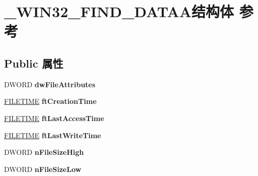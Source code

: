 \hypertarget{struct___w_i_n32___f_i_n_d___d_a_t_a_a}{}\section{\+\_\+\+W\+I\+N32\+\_\+\+F\+I\+N\+D\+\_\+\+D\+A\+T\+A\+A结构体 参考}
\label{struct___w_i_n32___f_i_n_d___d_a_t_a_a}
\subsection*{Public 属性}
\begin{DoxyCompactItemize}
\item 
\mbox{\label{struct___w_i_n32___f_i_n_d___d_a_t_a_a_a7dc6feecb5071ea3bcc9bca74797bab4}} 
D\+W\+O\+RD {\bfseries dw\+File\+Attributes}
\item 
\mbox{\label{struct___w_i_n32___f_i_n_d___d_a_t_a_a_ac8481fb5fca1f97285088f5cc46f7925}} 
\hyperlink{struct___f_i_l_e_t_i_m_e}{F\+I\+L\+E\+T\+I\+ME} {\bfseries ft\+Creation\+Time}
\item 
\mbox{\label{struct___w_i_n32___f_i_n_d___d_a_t_a_a_a845c08313fdf11eff063ca54fb3af2aa}} 
\hyperlink{struct___f_i_l_e_t_i_m_e}{F\+I\+L\+E\+T\+I\+ME} {\bfseries ft\+Last\+Access\+Time}
\item 
\mbox{\label{struct___w_i_n32___f_i_n_d___d_a_t_a_a_ae994c97328d0e6eadd3cad2975192aac}} 
\hyperlink{struct___f_i_l_e_t_i_m_e}{F\+I\+L\+E\+T\+I\+ME} {\bfseries ft\+Last\+Write\+Time}
\item 
\mbox{\label{struct___w_i_n32___f_i_n_d___d_a_t_a_a_a2993fb25d556173675c4642765cdc9ea}} 
D\+W\+O\+RD {\bfseries n\+File\+Size\+High}
\item 
\mbox{\label{struct___w_i_n32___f_i_n_d___d_a_t_a_a_ac087a8c9d29499cacf4bdd8e3784d579}} 
D\+W\+O\+RD {\bfseries n\+File\+Size\+Low}
\item 
\mbox{\label{struct___w_i_n32___f_i_n_d___d_a_t_a_a_a5caad74ad97051fa9bbbd61b3483b55f}} 

\end{DoxyCompactItemize}
